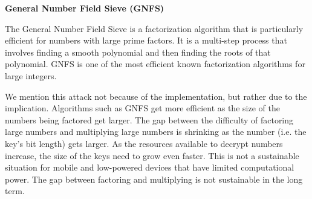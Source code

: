 \documentclass{article}
\begin{document}
    
    
    
    \begin{center}
    \textbf{General Number Field Sieve (GNFS)}
    \end{center}
    
    The General Number Field Sieve is a factorization algorithm that is particularly efficient for numbers with large prime factors. It is a multi-step process that involves finding a smooth polynomial and then finding the roots of that polynomial. GNFS is one of the most efficient known factorization algorithms for large integers.
    
    \vspace{3mm}
    We mention this attack not because of the implementation, but rather due to the implication. Algorithms such as GNFS get more efficient as the size of the numbers being factored get larger. The gap between the difficulty of factoring large numbers and multiplying large numbers is shrinking as the number (i.e. the key's bit length) gets larger. As the resources available to decrypt numbers increase, the size of the keys need to grow even faster. This is not a sustainable situation for mobile and low-powered devices that have limited computational power. The gap between factoring and multiplying is not sustainable in the long term.
    
\end{document}
